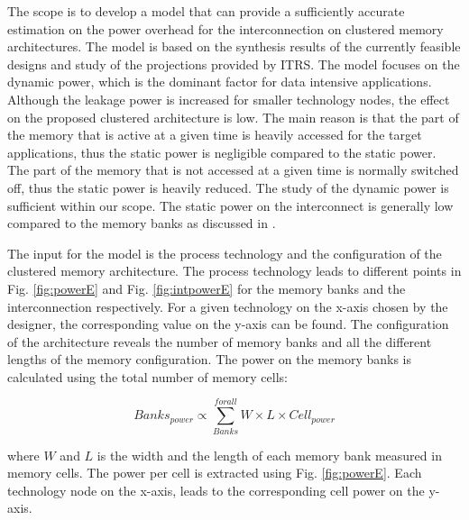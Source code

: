 The scope is to develop a model that can provide a sufficiently accurate estimation on the power overhead for the interconnection on clustered memory architectures.
 The model is based on the synthesis results of the currently feasible designs and study of the projections provided by ITRS.
 The model focuses on the dynamic power, which is the dominant factor for data intensive applications.
 Although the leakage power is increased for smaller technology nodes, the effect on the proposed clustered architecture is low.
 The main reason is that the part of the memory that is active at a given time is heavily accessed for the target applications, thus the static power is negligible compared to the static power.
 The part of the memory that is not accessed at a given time is normally switched off, thus the static power is heavily reduced. 
 The study of the dynamic power is sufficient within our scope.
 The static power on the interconnect is generally low compared to the memory banks as discussed in \cite{liu1994power}.
 
 The input for the model is the process technology and the configuration of the clustered memory architecture.
 The process technology leads to different points in Fig. \ref{fig:powerE} and Fig. \ref{fig:intpowerE} for the memory banks and the interconnection respectively.
 For a given technology on the x-axis chosen by the designer, the corresponding value on the y-axis can be found.
 The configuration of the architecture reveals the number of memory banks and all the different lengths of the memory configuration.
 The power on the memory banks is calculated using the total number of memory cells:
 \begin{center}
 $$ Banks_{power} \propto \sum_{Banks}^{for all} W \times L \times Cell_{power} $$
 \end{center}
  where $W$ and $L$ is the width and the length of each memory bank measured in memory cells. 
  The power per cell is extracted using Fig. \ref{fig:powerE}.
  Each technology node on the x-axis, leads to the corresponding cell power on the y-axis.

